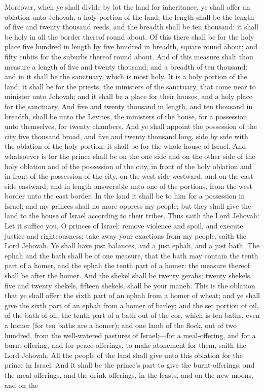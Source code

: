 Moreover, when ye shall divide by lot the land for inheritance, ye shall offer an oblation unto Jehovah, a holy portion of the land; the length shall be the length of five and twenty thousand reeds, and the breadth shall be ten thousand: it shall be holy in all the border thereof round about. Of this there shall be for the holy place five hundred in length by five hundred in breadth, square round about; and fifty cubits for the suburbs thereof round about. And of this measure shalt thou measure a length of five and twenty thousand, and a breadth of ten thousand: and in it shall be the sanctuary, which is most holy. It is a holy portion of the land; it shall be for the priests, the ministers of the sanctuary, that come near to minister unto Jehovah; and it shall be a place for their houses, and a holy place for the sanctuary. And five and twenty thousand in length, and ten thousand in breadth, shall be unto the Levites, the ministers of the house, for a possession unto themselves, for twenty chambers. And ye shall appoint the possession of the city five thousand broad, and five and twenty thousand long, side by side with the oblation of the holy portion: it shall be for the whole house of Israel. And whatsoever is for the prince shall be on the one side and on the other side of the holy oblation and of the possession of the city, in front of the holy oblation and in front of the possession of the city, on the west side westward, and on the east side eastward; and in length answerable unto one of the portions, from the west border unto the east border. In the land it shall be to him for a possession in Israel: and my princes shall no more oppress my people; but they shall give the land to the house of Israel according to their tribes.  Thus saith the Lord Jehovah: Let it suffice you, O princes of Israel: remove violence and spoil, and execute justice and righteousness; take away your exactions from my people, saith the Lord Jehovah. Ye shall have just balances, and a just ephah, and a just bath. The ephah and the bath shall be of one measure, that the bath may contain the tenth part of a homer, and the ephah the tenth part of a homer: the measure thereof shall be after the homer. And the shekel shall be twenty gerahs; twenty shekels, five and twenty shekels, fifteen shekels, shall be your maneh.  This is the oblation that ye shall offer: the sixth part of an ephah from a homer of wheat; and ye shall give the sixth part of an ephah from a homer of barley; and the set portion of oil, of the bath of oil, the tenth part of a bath out of the cor, which is ten baths, even a homer (for ten baths are a homer); and one lamb of the flock, out of two hundred, from the well-watered pastures of Israel;—for a meal-offering, and for a burnt-offering, and for peace-offerings, to make atonement for them, saith the Lord Jehovah. All the people of the land shall give unto this oblation for the prince in Israel. And it shall be the prince’s part to give the burnt-offerings, and the meal-offerings, and the drink-offerings, in the feasts, and on the new moons, and on the 